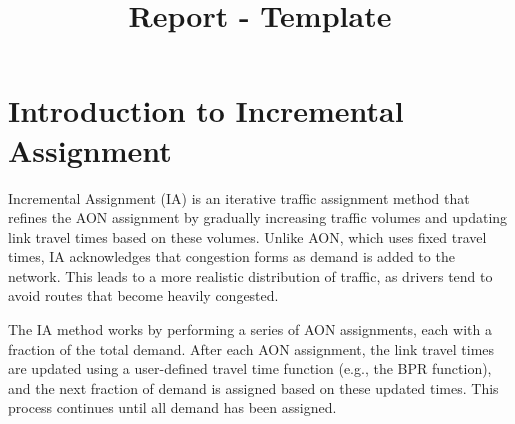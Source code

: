 \documentclass{rapportCS} %
\title{Report - Template}
\begin{document}







        
\fairemarges 
\fairepagedegarde 





\section{Introduction to Incremental Assignment}

Incremental Assignment (IA) is an iterative traffic assignment method that refines the AON assignment by gradually increasing traffic volumes and updating link travel times based on these volumes. Unlike AON, which uses fixed travel times, IA acknowledges that congestion forms as demand is added to the network. This leads to a more realistic distribution of traffic, as drivers tend to avoid routes that become heavily congested.

The IA method works by performing a series of AON assignments, each with a fraction of the total demand. After each AON assignment, the link travel times are updated using a user-defined travel time function (e.g., the BPR function), and the next fraction of demand is assigned based on these updated times. This process continues until all demand has been assigned.
\end{document}
